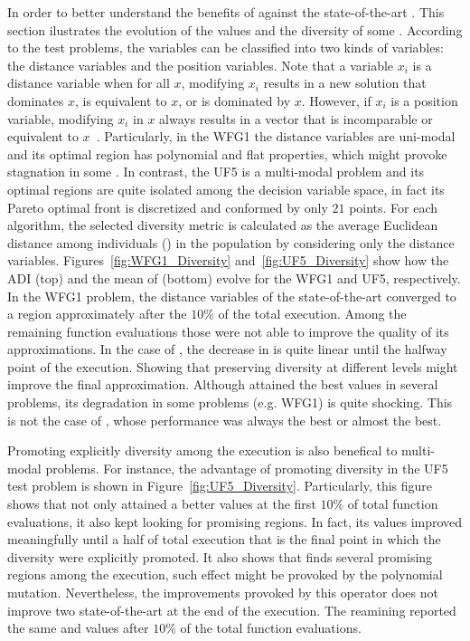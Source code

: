 In order to better understand the benefits of \VSDMOEAD{} against the state-of-the-art \MOEAS{}.
%
This section ilustrates the evolution of the \HV{} values and the diversity of some \MOPS{}.
%
According to the \WFG{} test problems, the variables can be classified into two kinds of variables: the distance variables and the position variables.
%
Note that a variable $x_i$ is a distance variable when for all $x$, modifying $x_i$ results in a new solution that dominates $x$, is equivalent to $x$, or is dominated by $x$.
%
However, if $x_i$ is a position variable, modifying $x_i$ in $x$ always results in a vector that is incomparable or equivalent to $x$~\cite{huband2006review}.
%
Particularly, in the WFG1 the distance variables are uni-modal and its optimal region has polynomial and flat properties, which might provoke stagnation in some \MOEAS{}.
%
In contrast, the UF5 is a multi-modal problem and its optimal regions are quite isolated among the decision variable space, in fact its Pareto optimal front is discretized and conformed by only $21$ points.
%
%
For each algorithm, the selected diversity metric is calculated as the average Euclidean distance among individuals (\ADI{}) in the population by considering only the distance variables.
%
Figures~\ref{fig:WFG1_Diversity} and~\ref{fig:UF5_Diversity} show how the ADI (top) and the mean of \HV{} (bottom) evolve for the WFG1 and UF5, respectively.
%
In the WFG1 problem, the distance variables of the state-of-the-art \MOEAS{} converged to a region approximately after the $10\%$ of the total execution.
%
Among the remaining function evaluations those \MOEAS{} were not able to improve the quality of its approximations.
%
In the case of \VSDMOEAD{}, the decrease in \ADI{} is quite linear until the halfway point of the execution.
%
Showing that preserving diversity at different levels might improve the final approximation.
%
Although \RMOEA{} attained the best \HV{} values in several problems, its degradation in some problems (e.g. WFG1) is quite shocking.
%
This is not the case of \VSDMOEAD{}, whose performance was always the best or almost the best.
%

Promoting explicitly diversity among the execution is also benefical to multi-modal problems.
%
For instance, the advantage of promoting diversity in the UF5 test problem is shown in Figure~\ref{fig:UF5_Diversity}.
%
Particularly, this figure shows that \VSDMOEAD{} not only attained a better \HV{} values at the first $10\%$ of total function evaluations, it also kept looking for promising regions.
%
In fact, its \HV{} values improved meaningfully until a half of total execution that is the final point in which the diversity were explicitly promoted.
%
It also shows that \MOEADDE{} finds several promising regions among the execution, such effect might be provoked by the polynomial mutation.
%
Nevertheless, the improvements provoked by this operator does not improve two state-of-the-art \MOEAS{} at the end of the execution.
%
The reamining \MOEAS{} reported the same \HV{} and \ADI{} values after $10\%$ of the total function evaluations.


